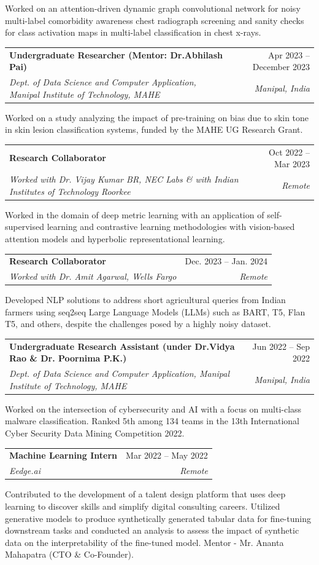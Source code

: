 \documentclass[a4paper,20pt]{article}
\makeatletter
\newcommand{\resumeSubheading}[4]{
  \vspace{-1pt}\item
    \begin{tabular*}{0.97\textwidth}{l@{\extracolsep{\fill}}r}
      \textbf{#1} & #2 \\
      \textit{#3} & \textit{#4} \\
    \end{tabular*}\vspace{-5pt}
}
\makeatother
\begin{document}
    Worked on an attention-driven dynamic graph convolutional network for noisy multi-label comorbidity awareness chest radiograph screening and sanity checks for class activation maps in multi-label classification in chest x-rays.

\resumeSubheading{Undergraduate Researcher (Mentor: Dr.Abhilash Pai)}{Apr 2023 -- December 2023}{Dept. of Data Science and Computer Application, Manipal Institute of Technology, MAHE}{Manipal, India}
    \vspace{-1.5pt}
    
    Worked on a study analyzing the impact of pre-training on bias due to skin tone in skin lesion classification systems, funded by the MAHE UG Research Grant.
    
\resumeSubheading{Research Collaborator}{Oct 2022 -- Mar 2023}{Worked with Dr. Vijay Kumar BR, NEC Labs \& with Indian Institutes of Technology Roorkee }{Remote}
    \vspace{-3.5pt}
    
    Worked in the domain of deep metric learning with an application of self-supervised learning and contrastive learning methodologies with vision-based attention models and hyperbolic representational learning.


\resumeSubheading{Research Collaborator}{Dec. 2023 -- Jan. 2024 }{Worked with Dr. Amit Agarwal, Wells Fargo}{Remote}
    \vspace{-1.5pt}    
    
    Developed NLP solutions to address short agricultural queries from Indian farmers using seq2seq Large Language Models (LLMs) such as BART, T5, Flan T5, and others, despite the challenges posed by a highly noisy dataset.

\resumeSubheading{Undergraduate Research Assistant (under Dr.Vidya Rao \& Dr. Poornima P.K.) }{Jun 2022 -- Sep 2022 }{Dept. of Data Science and Computer Application, Manipal Institute of Technology, MAHE}{Manipal, India}
    \vspace{-1.5pt}
    
    Worked on the intersection of cybersecurity and AI with a focus on multi-class malware classification. Ranked 5th among 134 teams in the 13th International Cyber Security Data Mining Competition 2022.
    
\resumeSubheading{Machine Learning Intern}{Mar 2022 -- May 2022}{Eedge.ai}{Remote}
    \vspace{-1.5pt}
    
    Contributed to the development of a talent design platform that uses deep learning to discover skills and simplify digital consulting careers. Utilized generative models to produce synthetically generated tabular data for fine-tuning downstream tasks and conducted an analysis to assess the impact of synthetic data on the interpretability of the fine-tuned model. Mentor - Mr. Ananta Mahapatra (CTO \& Co-Founder).
\end{document}
